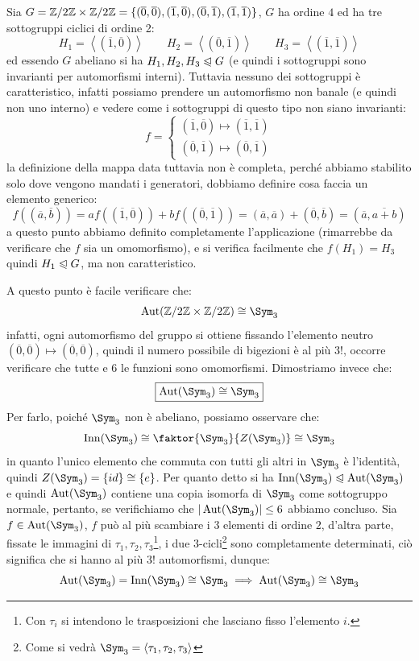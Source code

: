 \documentclass[11pt]{scrartcl}
\begin{document}
\begin{example}
    Sia $G = \mathbb{Z}/{2}\mathbb{Z} \times \mathbb{Z}/{2}\mathbb{Z} = \{(\overline 0, \overline 0),(\overline 1, \overline 0),(\overline 0, \overline 1),(\overline 1, \overline 1)\}$, $G$ ha ordine $4$ ed ha tre sottogruppi ciclici di ordine 2:
        \[ H_1 = \left<(\overline 1, \overline 0)\right> \qquad H_2 = \left<(\overline 0, \overline 1)\right> \qquad H_3 = \left<(\overline 1, \overline 1)\right>
            \] 
    ed essendo $G$ abeliano si ha $H_1,H_2,H_3 \trianglelefteqslant G$ (e quindi i sottogruppi sono invarianti per automorfismi interni). Tuttavia nessuno dei sottogruppi è caratteristico,
    infatti possiamo prendere un automorfismo non banale (e quindi non uno interno) e vedere come i sottogruppi di questo tipo non siano invarianti:
        \[ f = \begin{cases}
            (\overline 1, \overline 0) \longmapsto (\overline 1, \overline 1)\\
            (\overline 0, \overline 1) \longmapsto (\overline 0, \overline 1)
        \end{cases}
            \]
    la definizione della mappa data tuttavia non è completa, perché abbiamo stabilito solo dove vengono mandati i generatori, dobbiamo definire cosa faccia un elemento generico:
        \[ f ((\overline a, \overline b)) = af((\overline 1, \overline 0)) + bf((\overline 0, \overline 1)) = (\overline a, \overline a) + (\overline 0, \overline b) = (\overline a, \overline{a + b})
            \]
    a questo punto abbiamo definito completamente l'applicazione (rimarrebbe da verificare che $f$ sia un omomorfismo),  e si verifica facilmente che
     $f(H_1) = H_3 $ quindi $H_1 \trianglelefteqslant G$, ma non caratteristico.
\end{example}

A questo punto è facile verificare che:
    \[ \Aut(\Z2 \times \Z2) \cong \Sym_3
        \]
infatti, ogni automorfismo del gruppo si ottiene fissando l'elemento neutro $(\overline 0, \overline 0) \longmapsto (\overline 0, \overline 0)$, quindi il numero possibile di bigezioni è al più $3!$, occorre
verificare che tutte e $6$ le funzioni sono omomorfismi. Dimostriamo invece che:
    \[ \boxed{\Aut(\Sym_3) \cong \Sym_3}
        \]
Per farlo, poiché $\Sym_3$ non è abeliano, possiamo osservare che:
    \[ \Inn(\Sym_3) \cong \faktor{\Sym_3}{Z(\Sym_3)} \cong \Sym_3
        \]
in quanto l'unico elemento che commuta con tutti gli altri in $\Sym_3$ è l'identità, quindi $Z(\Sym_3) = \{id\} \cong \{e\}$.
Per quanto detto si ha $\Inn(\Sym_3) \trianglelefteqslant \Aut(\Sym_3)$ e quindi $\Aut(\Sym_3)$ contiene una copia isomorfa di $\Sym_3$ come sottogruppo normale, pertanto,
se verifichiamo che $|\Aut(\Sym_3)| \leq 6$ abbiamo concluso. Sia $f \in \Aut(\Sym_3)$, $f$ può al più scambiare i $3$ elementi di ordine $2$, d'altra parte, fissate le 
immagini di $\tau_1,\tau_2,\tau_3$\footnote{Con $\tau_i$ si intendono le trasposizioni che lasciano fisso l'elemento $i$.}, i due 
$3$-cicli\footnote{Come si vedrà $\Sym_3 = \left<\tau_1,\tau_2,\tau_3\right>$} sono completamente determinati,
ciò significa che si hanno al più $3!$ automorfismi, dunque:
    \[ \Aut(\Sym_3) = \Inn(\Sym_3) \cong \Sym_3 \implies \Aut(\Sym_3) \cong \Sym_3 
        \]
\end{document}
